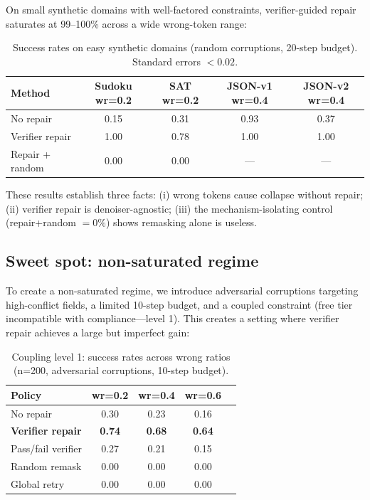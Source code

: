 \documentclass[11pt,a4paper,twoside]{article}
\theoremstyle{definition}
\begin{document}
On small synthetic domains with well-factored constraints, verifier-guided repair saturates at 99--100\% across a wide wrong-token range:

\begin{table}[ht]
\centering
\caption{Success rates on easy synthetic domains (random corruptions, 20-step budget). Standard errors $< 0.02$.}
\label{tab:easy}
\begin{tabular}{lcccc}
\toprule
Method & Sudoku wr=0.2 & SAT wr=0.2 & JSON-v1 wr=0.4 & JSON-v2 wr=0.4 \\
\midrule
No repair & 0.15 & 0.31 & 0.93 & 0.37 \\
Verifier repair & 1.00 & 0.78 & 1.00 & 1.00 \\
Repair + random & 0.00 & 0.00 & --- & --- \\
\bottomrule
\end{tabular}
\end{table}

These results establish three facts: (i) wrong tokens cause collapse without repair; (ii) verifier repair is denoiser-agnostic; (iii) the mechanism-isolating control (repair+random $=0\%$) shows remasking alone is useless.

\subsection{Sweet spot: non-saturated regime}
\label{sec:sweet}

To create a non-saturated regime, we introduce adversarial corruptions targeting high-conflict fields, a limited 10-step budget, and a coupled constraint (free tier incompatible with compliance---level 1). This creates a setting where verifier repair achieves a large but imperfect gain:

\begin{table}[ht]
\centering
\caption{Coupling level 1: success rates across wrong ratios (n=200, adversarial corruptions, 10-step budget).}
\label{tab:sweet}
\begin{tabular}{lcccc}
\toprule
Policy & wr=0.2 & wr=0.4 & wr=0.6 \\
\midrule
No repair & 0.30 & 0.23 & 0.16 \\
\textbf{Verifier repair} & \textbf{0.74} & \textbf{0.68} & \textbf{0.64} \\
Pass/fail verifier & 0.27 & 0.21 & 0.15 \\
Random remask & 0.00 & 0.00 & 0.00 \\
Global retry & 0.00 & 0.00 & 0.00 \\
\bottomrule
\end{tabular}
\end{table}
\end{document}
